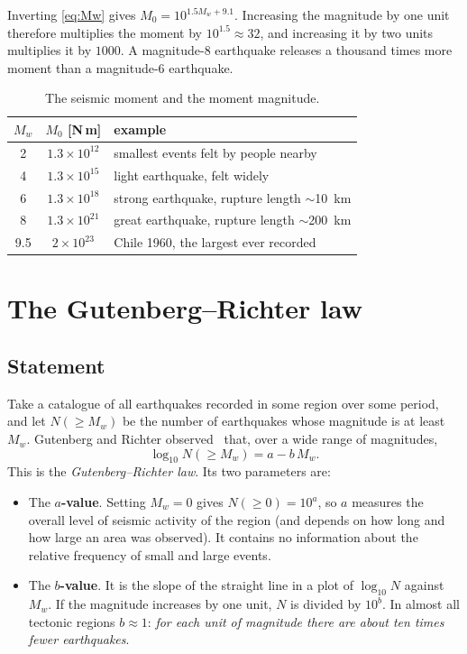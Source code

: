 Inverting \cref{eq:Mw} gives $M_0 = 10^{1.5M_w+9.1}$. Increasing the magnitude by one unit
therefore multiplies the moment by $10^{1.5}\approx 32$, and increasing it by two units multiplies
it by $1000$. A magnitude-8 earthquake releases a thousand times more moment than a magnitude-6
earthquake.

\begin{table}[t]
\centering
\caption{The seismic moment and the moment magnitude.}
\label{tab:Mw}
\begin{tabular}{ccl}
\toprule
$M_w$ & $M_0$ [N\,m] & example \\
\midrule
2 & $1.3\times10^{12}$ & smallest events felt by people nearby \\
4 & $1.3\times10^{15}$ & light earthquake, felt widely \\
6 & $1.3\times10^{18}$ & strong earthquake, rupture length $\sim$\SI{10}{km} \\
8 & $1.3\times10^{21}$ & great earthquake, rupture length $\sim$\SI{200}{km} \\
9.5 & $2\times10^{23}$ & Chile 1960, the largest ever recorded \\
\bottomrule
\end{tabular}
\end{table}

\section{The Gutenberg--Richter law}
\label{sec:GR}

\subsection{Statement}

Take a catalogue of all earthquakes recorded in some region over some period, and let
$N(\geq M_w)$ be the number of earthquakes whose magnitude is at least $M_w$. Gutenberg and
Richter observed~\cite{GutenbergRichter1944} that, over a wide range of magnitudes,
\begin{equation}
  \log_{10} N(\geq M_w) = a - b\, M_w .
  \label{eq:GR}
\end{equation}
This is the \emph{Gutenberg--Richter law}. Its two parameters are:
\begin{itemize}
  \item The \textbf{$a$-value}. Setting $M_w=0$ gives $N(\geq 0)=10^{a}$, so $a$ measures the
    overall level of seismic activity of the region (and depends on how long and how large an
    area was observed). It contains no information about the relative frequency of small and large
    events.
  \item The \textbf{$b$-value}. It is the slope of the straight line in a plot of $\log_{10}N$
    against $M_w$. If the magnitude increases by one unit, $N$ is divided by $10^{b}$. In almost all
    tectonic regions $b\approx 1$: \emph{for each unit of magnitude there are about ten times fewer
    earthquakes}.
\end{itemize}


